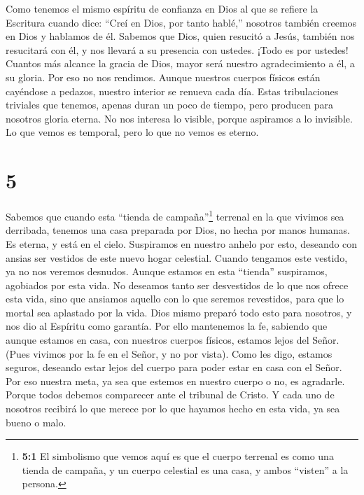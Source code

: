  Como tenemos el mismo espíritu de confianza en Dios al que
se refiere la Escritura cuando dice: ``Creí en Dios, por tanto hablé,''
nosotros también creemos en Dios y hablamos de él.  Sabemos
que Dios, quien resucitó a Jesús, también nos resucitará con él, y nos
llevará a su presencia con ustedes.  ¡Todo es por ustedes!
Cuantos más alcance la gracia de Dios, mayor será nuestro agradecimiento
a él, a su gloria.  Por eso no nos rendimos. Aunque
nuestros cuerpos físicos están cayéndose a pedazos, nuestro interior se
renueva cada día.  Estas tribulaciones triviales que
tenemos, apenas duran un poco de tiempo, pero producen para nosotros
gloria eterna.  No nos interesa lo visible, porque
aspiramos a lo invisible. Lo que vemos es temporal, pero lo que no vemos
es eterno.

\hypertarget{section-4}{%
\section{5}\label{section-4}}

 Sabemos que cuando esta ``tienda de campaña''\footnote{\textbf{5:1}
  El simbolismo que vemos aquí es que el cuerpo terrenal es como una
  tienda de campaña, y un cuerpo celestial es una casa, y ambos
  ``visten'' a la persona.} terrenal en la que vivimos sea derribada,
tenemos una casa preparada por Dios, no hecha por manos humanas. Es
eterna, y está en el cielo.  Suspiramos en nuestro anhelo
por esto, deseando con ansias ser vestidos de este nuevo hogar
celestial.  Cuando tengamos este vestido, ya no nos veremos
desnudos.  Aunque estamos en esta ``tienda'' suspiramos,
agobiados por esta vida. No deseamos tanto ser desvestidos de lo que nos
ofrece esta vida, sino que ansiamos aquello con lo que seremos
revestidos, para que lo mortal sea aplastado por la vida. 
Dios mismo preparó todo esto para nosotros, y nos dio al Espíritu como
garantía.  Por ello mantenemos la fe, sabiendo que aunque
estamos en casa, con nuestros cuerpos físicos, estamos lejos del Señor.
 (Pues vivimos por la fe en el Señor, y no por vista).
 Como les digo, estamos seguros, deseando estar lejos del
cuerpo para poder estar en casa con el Señor.  Por eso
nuestra meta, ya sea que estemos en nuestro cuerpo o no, es agradarle.
 Porque todos debemos comparecer ante el tribunal de
Cristo. Y cada uno de nosotros recibirá lo que merece por lo que hayamos
hecho en esta vida, ya sea bueno o malo.

